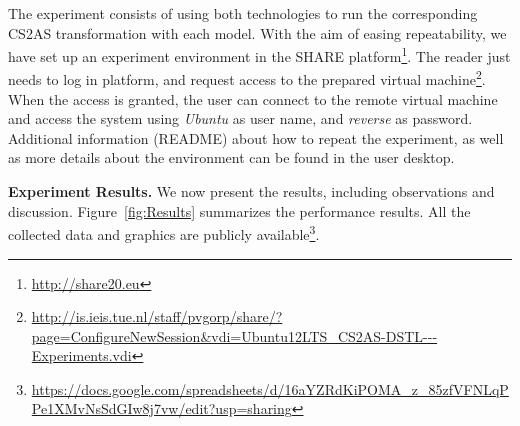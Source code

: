 \documentclass{llncs}
\begin{document}
The experiment consists of using both technologies to run the corresponding CS2AS transformation with each model. With the aim of easing repeatability, we have set up an experiment environment in the SHARE \cite{vanGorp2012share} platform\footnote{\url{http://share20.eu}}. The reader just needs to log in platform, and request access to the prepared virtual machine\footnote{\url{http://is.ieis.tue.nl/staff/pvgorp/share/?page=ConfigureNewSession&vdi=Ubuntu12LTS_CS2AS-DSTL---Experiments.vdi}}. When the access is granted, the user can connect to the remote virtual machine and access the system using \textit{Ubuntu} as user name, and \textit{reverse} as password. Additional information (README) about how to repeat the experiment, as well as more details about the environment can be found in the user desktop.


\textbf{Experiment Results.} We now present the results, including observations and discussion. Figure~\ref{fig:Results} summarizes the performance results. All the collected data and graphics are publicly available\footnote{\url{https://docs.google.com/spreadsheets/d/16aYZRdKiPOMA_z_85zfVFNLqPPe1XMvNsSdGIw8j7vw/edit?usp=sharing}}.
\end{document}
